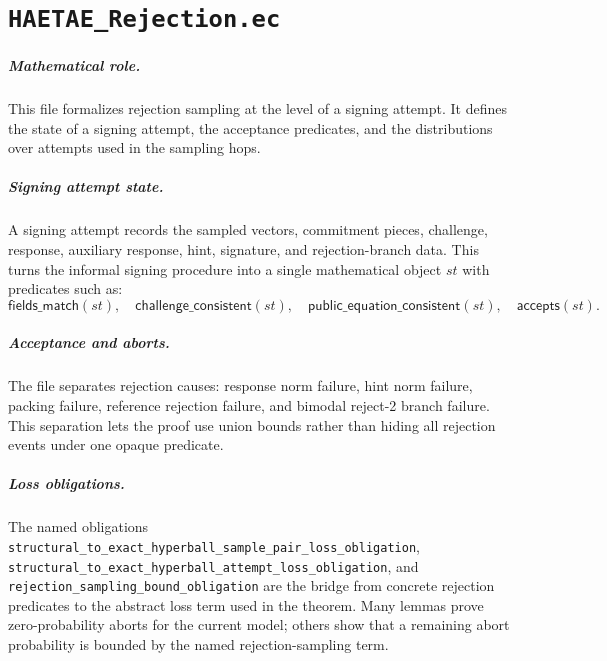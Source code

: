 \documentclass[11pt]{report}
\newcommand{\ec}[1]{\nolinkurl{#1}}
\newcommand{\ecchapter}[2]{\chapter{\texorpdfstring{\texttt{#1}}{#2}}}
\theoremstyle{definition}
\theoremstyle{plain}
\theoremstyle{definition}
\begin{document}


\ecchapter{HAETAE\_Rejection.ec}{HAETAE Rejection.ec}

\paragraph{Mathematical role.}
This file formalizes rejection sampling at the level of a signing attempt.  It
defines the state of a signing attempt, the acceptance predicates, and the
distributions over attempts used in the sampling hops.

\paragraph{Signing attempt state.}
A signing attempt records the sampled vectors, commitment pieces, challenge,
response, auxiliary response, hint, signature, and rejection-branch data.  This
turns the informal signing procedure into a single mathematical object
\(st\) with predicates such as:
\[
  \mathsf{fields\_match}(st),\quad
  \mathsf{challenge\_consistent}(st),\quad
  \mathsf{public\_equation\_consistent}(st),\quad
  \mathsf{accepts}(st).
\]

\paragraph{Acceptance and aborts.}
The file separates rejection causes: response norm failure, hint norm failure,
packing failure, reference rejection failure, and bimodal reject-2 branch
failure.  This separation lets the proof use union bounds rather than hiding
all rejection events under one opaque predicate.

\paragraph{Loss obligations.}
The named obligations
\ec{structural_to_exact_hyperball_sample_pair_loss_obligation},
\ec{structural_to_exact_hyperball_attempt_loss_obligation}, and
\ec{rejection_sampling_bound_obligation} are the bridge from concrete rejection
predicates to the abstract loss term used in the theorem.  Many lemmas prove
zero-probability aborts for the current model; others show that a remaining
abort probability is bounded by the named rejection-sampling term.


\end{document}
